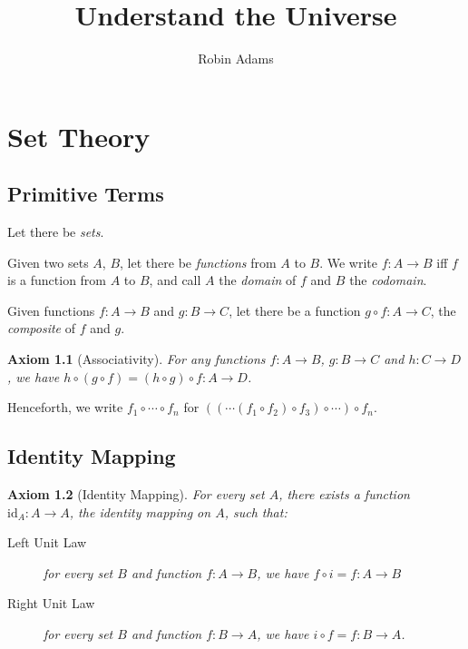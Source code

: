 \documentclass{book}
\title{Understand the Universe}
\author{Robin Adams}
\newtheorem{ax}{Axiom}
\theoremstyle{definition}
\newcommand{\id}[1]{\ensuremath{\mathrm{id}_{#1}}}
\begin{document}
  
  \maketitle
  
  \chapter{Set Theory}
  
  \section{Primitive Terms}
  
  Let there be \emph{sets}.
  
  Given two sets $A$, $B$, let there be \emph{functions} from $A$ to $B$. We 
  write $f : A \rightarrow B$ iff $f$ is a function from $A$ to $B$, and call 
  $A$ 
  the \emph{domain} of $f$ and $B$ the \emph{codomain}.
  
  Given functions $f : A \rightarrow B$ and $g : B \rightarrow C$, let there be 
  a 
  function $g \circ f : A \rightarrow C$, the \emph{composite} of $f$ and $g$.
  
  \begin{ax}[Associativity]
    For any functions $f : A \rightarrow B$, $g : B \rightarrow C$ and $h : C 
    \rightarrow D$, we have $h \circ (g \circ f) = (h \circ g) \circ f : A 
    \rightarrow D$.
  \end{ax}
  
  Henceforth, we write $f_1 \circ \cdots \circ f_n$ for $((\cdots(f_1 \circ 
  f_2) 
  \circ f_3) \circ \cdots ) \circ f_n$.
  
  \section{Identity Mapping}
  
  \begin{ax}[Identity Mapping]
    For every set $A$, there exists a function $\id{A} : A \rightarrow A$, the 
    \emph{identity mapping} on $A$, such that:
    \begin{description}
      \item[Left Unit Law] for every set $B$ and function $f : A \rightarrow B$, 
      we 
      have $f \circ 
      i = f : A \rightarrow B$
      \item[Right Unit Law] for every set $B$ and function $f : B \rightarrow 
      A$, we 
      have $i \circ f 
      = f : B \rightarrow A$.
    \end{description}
  \end{ax}
  
\end{document}
